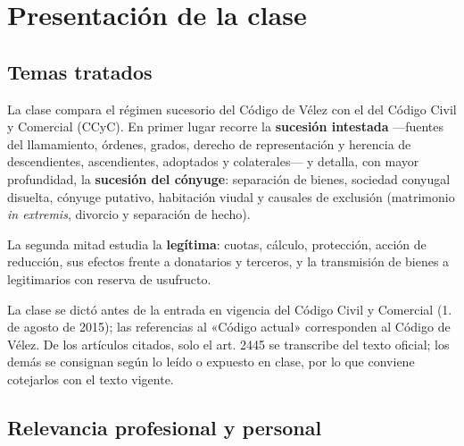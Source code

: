 \documentclass[12pt,oneside]{book}
\begin{document}
\tableofcontents
\clearpage


\chapter*{Presentación de la clase}

\section*{Temas tratados}

La clase compara el régimen sucesorio del Código de Vélez con el del Código Civil y Comercial (CCyC). En primer lugar recorre la \textbf{sucesión intestada} ---fuentes del llamamiento, órdenes, grados, derecho de representación y herencia de descendientes, ascendientes, adoptados y colaterales--- y detalla, con mayor profundidad, la \textbf{sucesión del cónyuge}: separación de bienes, sociedad conyugal disuelta, cónyuge putativo, habitación viudal y causales de exclusión (matrimonio \textit{in extremis}, divorcio y separación de hecho).

La segunda mitad estudia la \textbf{legítima}: cuotas, cálculo, protección, acción de reducción, sus efectos frente a donatarios y terceros, y la transmisión de bienes a legitimarios con reserva de usufructo.

\begin{note}
La clase se dictó antes de la entrada en vigencia del Código Civil y Comercial (1.\textordmasculine{} de agosto de 2015); las referencias al «Código actual» corresponden al Código de Vélez. De los artículos citados, solo el art. 2445 se transcribe del texto oficial; los demás se consignan según lo leído o expuesto en clase, por lo que conviene cotejarlos con el texto vigente.
\end{note}

\section*{Relevancia profesional y personal}
\end{document}
